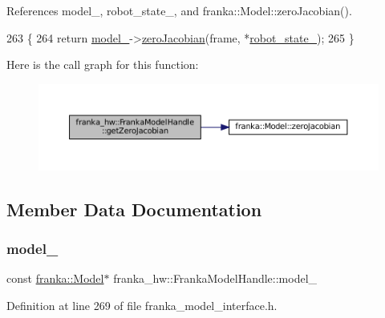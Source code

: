 References model\+\_\+, robot\+\_\+state\+\_\+, and franka\+::\+Model\+::zero\+Jacobian().


\begin{DoxyCode}
263             \{
264     \textcolor{keywordflow}{return} \hyperlink{classfranka__hw_1_1FrankaModelHandle_a0c47e6c735f1bd809581b0498d53349b}{model\_}->\hyperlink{classfranka_1_1Model_a0b0fb1bf5f54be87bfaa023e4d0c5b9f}{zeroJacobian}(frame, *\hyperlink{classfranka__hw_1_1FrankaModelHandle_a16192f263ce4709d99f557c6d8fabeb1}{robot\_state\_});
265   \}
\end{DoxyCode}
Here is the call graph for this function\+:
\nopagebreak
\begin{figure}[H]
\begin{center}
\leavevmode
\includegraphics[width=350pt]{classfranka__hw_1_1FrankaModelHandle_a5ce6ac6116ac3c45c923e5c2d515616c_cgraph}
\end{center}
\end{figure}


\subsection{Member Data Documentation}
\mbox{\label{classfranka__hw_1_1FrankaModelHandle_a0c47e6c735f1bd809581b0498d53349b}} 
\subsubsection{\texorpdfstring{model\+\_\+}{model\_}}
{\footnotesize\ttfamily const \hyperlink{classfranka_1_1Model}{franka\+::\+Model}$\ast$ franka\+\_\+hw\+::\+Franka\+Model\+Handle\+::model\+\_\+\hspace{0.3cm}{\ttfamily [private]}}



Definition at line 269 of file franka\+\_\+model\+\_\+interface.\+h.



